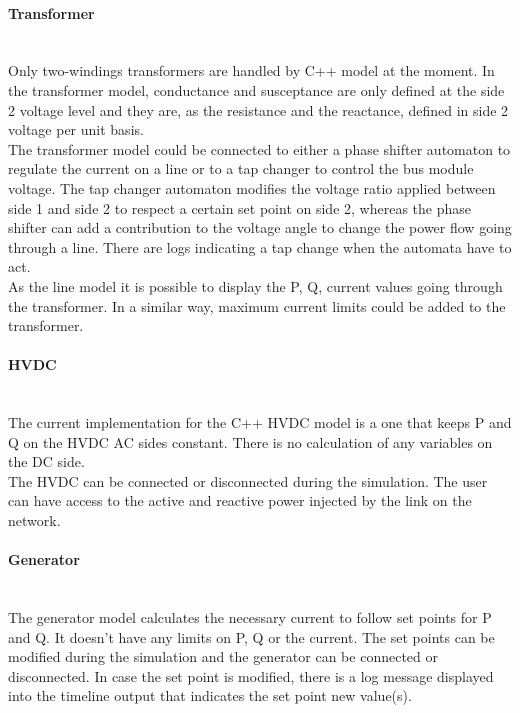 \documentclass[a4paper, 12pt]{report}
\begin{document}
\paragraph{Transformer}
~~\\

Only two-windings transformers are handled by \Dynawo C++ model at the moment. In the transformer model, conductance and susceptance are only defined at the side 2 voltage level and they are, as the resistance and the reactance, defined in side 2 voltage per unit basis. \\
The transformer model could be connected to either a phase shifter automaton to regulate the current on a line or to a tap changer to control the bus module voltage. The tap changer automaton modifies the voltage ratio applied between side 1 and side 2 to respect a certain set point on side 2, whereas the phase shifter can add a contribution to the voltage angle to change the power flow going through a line. There are logs indicating a tap change when the automata have to act. \\
As the line model it is possible to display the P, Q, current values going through the transformer. In a similar way, maximum current limits could be added to the transformer. \\

\paragraph{HVDC}
~~\\

The current implementation for the C++ HVDC model is a one that keeps P and Q on the HVDC AC sides constant. There is no calculation of any variables on the DC side. \\
The HVDC can be connected or disconnected during the simulation. The user can have access to the active and reactive power injected by the link on the network. \\

\paragraph{Generator}
~~\\

The generator model calculates the necessary current to follow set points for P and Q. It doesn't have any limits on P, Q or the current. The set points can be modified during the simulation and the generator can be connected or disconnected. In case the set point is modified, there is a log message displayed into the timeline output that indicates the set point new value(s). \\
\end{document}
